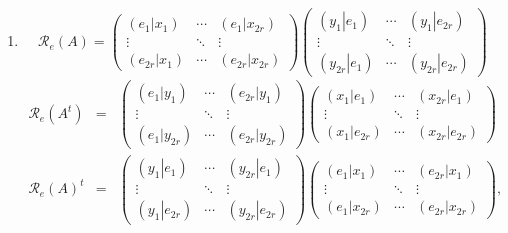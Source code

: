 \documentclass[aps,preprint]{revtex4}
\begin{document}
\begin{enumerate}
\item 
\begin{equation}
\mathcal{R}_{e}\left( A\right) =\left( 
\begin{array}{ccc}
\left( \left. e_{1}\right\vert x_{1}\right) & \cdots & \left( \left.
e_{1}\right\vert x_{2r}\right) \\ 
\vdots & \ddots & \vdots \\ 
\left( \left. e_{2r}\right\vert x_{1}\right) & \cdots & \left( \left.
e_{2r}\right\vert x_{2r}\right)%
\end{array}%
\right) \left( 
\begin{array}{ccc}
\left( \left. y_{1}\right\vert e_{1}\right) & \cdots & \left( \left.
y_{1}\right\vert e_{2r}\right) \\ 
\vdots & \ddots & \vdots \\ 
\left( \left. y_{2r}\right\vert e_{1}\right) & \cdots & \left( \left.
y_{2r}\right\vert e_{2r}\right)%
\end{array}%
\right)
\end{equation}%
\begin{eqnarray}
\mathcal{R}_{e}\left( A^{t}\right) &=&\left( 
\begin{array}{ccc}
\left( \left. e_{1}\right\vert y_{1}\right) & \cdots & \left( \left.
e_{2r}\right\vert y_{1}\right) \\ 
\vdots & \ddots & \vdots \\ 
\left( \left. e_{1}\right\vert y_{2r}\right) & \cdots & \left( \left.
e_{2r}\right\vert y_{2r}\right)%
\end{array}%
\right) \left( 
\begin{array}{ccc}
\left( \left. x_{1}\right\vert e_{1}\right) & \cdots & \left( \left.
x_{2r}\right\vert e_{1}\right) \\ 
\vdots & \ddots & \vdots \\ 
\left( \left. x_{1}\right\vert e_{2r}\right) & \cdots & \left( \left.
x_{2r}\right\vert e_{2r}\right)%
\end{array}%
\right) \\
\mathcal{R}_{e}\left( A\right) ^{t} &=&\left( 
\begin{array}{ccc}
\left( \left. y_{1}\right\vert e_{1}\right) & \cdots & \left( \left.
y_{2r}\right\vert e_{1}\right) \\ 
\vdots & \ddots & \vdots \\ 
\left( \left. y_{1}\right\vert e_{2r}\right) & \cdots & \left( \left.
y_{2r}\right\vert e_{2r}\right)%
\end{array}%
\right) \left( 
\begin{array}{ccc}
\left( \left. e_{1}\right\vert x_{1}\right) & \cdots & \left( \left.
e_{2r}\right\vert x_{1}\right) \\ 
\vdots & \ddots & \vdots \\ 
\left( \left. e_{1}\right\vert x_{2r}\right) & \cdots & \left( \left.
e_{2r}\right\vert x_{2r}\right)%
\end{array}%
\right) ,
\end{eqnarray}


\end{enumerate}
\end{document}
